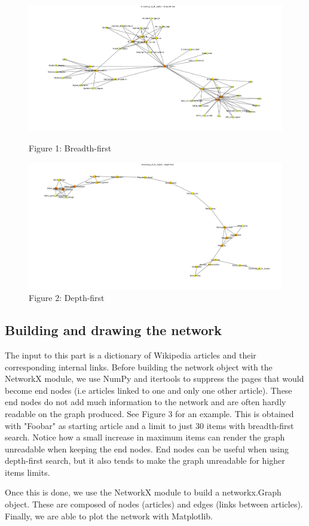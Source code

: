 \documentclass[10pt]{article}
\begin{document}
		\begin{figure}
		\begin{center}
			\includegraphics[width=\textwidth]{figure1.png}
    			 	\caption{Figure 1: Breadth-first}
				
			\vspace{3cm}
			
			\includegraphics[width=\textwidth]{figure2.png}
  			  	\caption{Figure 2: Depth-first}
		\end{center}
		\end{figure}
	
	
	\subsection{Building and drawing the network}
	The input to this part is a dictionary of Wikipedia articles and their corresponding internal links. Before building the network object with the NetworkX module, we use NumPy and itertools to suppress the pages that would become end nodes (i.e articles linked to one and only one other article). These end nodes do not add much information to the network and are often hardly readable on the graph produced. See Figure 3 for an example. This is obtained with "Foobar" as starting article and a limit to just 30 items with breadth-first search. Notice how a small increase in maximum items can render the graph unreadable when keeping the end nodes. End nodes can be useful when using depth-first search, but it also tends to make the graph unreadable for higher items limits.
	\par \noindent
	Once this is done, we use the NetworkX module to build a networkx.Graph object. These are composed of nodes (articles) and edges (links between articles). Finally, we are able to plot the network with Matplotlib.\par \noindent
	
\end{document}
